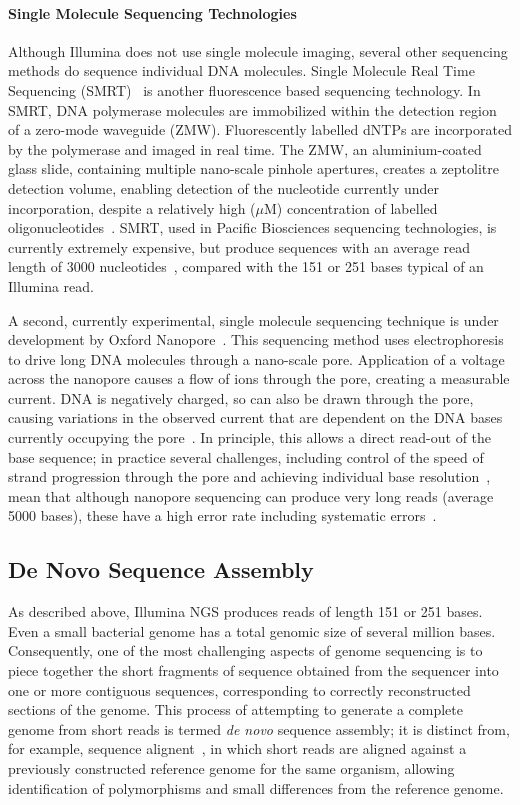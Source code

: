 \paragraph{Single Molecule Sequencing Technologies}
Although Illumina does not use single molecule imaging, several other sequencing methods do sequence individual DNA molecules. Single Molecule Real Time Sequencing (SMRT)~\cite{eid2008} is another fluorescence based sequencing technology. In SMRT, DNA polymerase molecules are immobilized within the detection region of a zero-mode waveguide (ZMW). Fluorescently labelled dNTPs are incorporated by the polymerase and imaged in real time. The ZMW, an aluminium-coated glass slide, containing multiple nano-scale pinhole apertures, creates a zeptolitre detection volume, enabling detection of the nucleotide currently under incorporation, despite a relatively high ($\mu$M) concentration of labelled oligonucleotides~\cite{Levene2003}. SMRT, used in Pacific Biosciences sequencing technologies, is currently extremely expensive, but produce sequences with an average read length of 3000 nucleotides~\cite{Roberts2013}, compared with the 151 or 251 bases typical of an Illumina read.

A second, currently experimental, single molecule sequencing technique is under development by Oxford Nanopore~\cite{Bayley2014}. This sequencing method uses electrophoresis to drive long DNA molecules through a nano-scale pore. Application of a voltage across the nanopore causes a flow of ions through the pore, creating a measurable current. DNA is negatively charged, so can also be drawn through the pore, causing variations in the observed current that are dependent on the DNA bases currently occupying the pore~\cite{Branton2008}. In principle, this allows a direct read-out of the base sequence; in practice several challenges, including control of the speed of strand progression through the pore and achieving individual base resolution~\cite{Laszlo2014}, mean that although nanopore sequencing can produce very long reads (average 5000 bases), these have a high error rate including systematic errors~\cite{Mikheyev2014}.  

\subsection{De Novo Sequence Assembly}
As described above, Illumina NGS produces reads of length 151 or 251 bases. Even a small bacterial genome has a total genomic size of several million bases. Consequently, one of the most challenging aspects of genome sequencing is to piece together the short fragments of sequence obtained from the sequencer into one or more contiguous sequences, corresponding to correctly reconstructed sections of the genome. This process of attempting to generate a complete genome from short reads is termed \textit{de novo} sequence assembly; it is distinct from, for example, sequence alignent~\cite{Li2010}, in which short reads are aligned against a previously constructed reference genome for the same organism, allowing identification of polymorphisms and small differences from the reference genome. 

